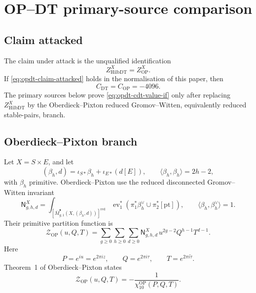 \section{OP--DT primary-source comparison}
\label{sec:op-dt-primary-source-comparison}

\subsection{Claim attacked}

The claim under attack is the unqualified identification
\begin{equation}
\label{eq:opdt-claim-attacked}
Z^{X}_{\mathrm{HilbDT}}=Z^{X}_{\mathrm{OP}}.
\end{equation}
If \eqref{eq:opdt-claim-attacked} holds in the normalisation of this
paper, then
\begin{equation}
\label{eq:opdt-cdt-value-if}
C_{\mathrm{DT}}=C_{\mathrm{OP}}=-4096.
\end{equation}
The primary sources below prove \eqref{eq:opdt-cdt-value-if} only after
replacing \(Z^{X}_{\mathrm{HilbDT}}\) by the Oberdieck--Pixton reduced
Gromov--Witten, equivalently reduced stable-pairs, branch.

\subsection{Oberdieck--Pixton branch}

Let \(X=S\times E\), and let
\begin{equation}
\label{eq:opdt-class}
(\beta_h,d)=\iota_{S*}\beta_h+\iota_{E*}(d[E]),
\qquad
\langle\beta_h,\beta_h\rangle=2h-2,
\end{equation}
with \(\beta_h\) primitive.  Oberdieck--Pixton use the reduced
disconnected Gromov--Witten invariant
\begin{equation}
\label{eq:opdt-op-invariant}
\mathsf N^X_{g,h,d}
=
\int_{[\overline M^{\bullet}_{g,1}(X,(\beta_h,d))]^{\mathrm{red}}}
\operatorname{ev}_1^*
\left(\pi_1^*\beta_h^\vee\cup\pi_2^*[\mathrm{pt}]\right),
\qquad
\langle\beta_h,\beta_h^\vee\rangle=1.
\end{equation}
Their primitive partition function is
\begin{equation}
\label{eq:opdt-op-series}
\mathcal Z_{\mathrm{OP}}(u,Q,T)
=
\sum_{g\geq0}\sum_{h\geq0}\sum_{d\geq0}
\mathsf N^X_{g,h,d}\,u^{2g-2}Q^{h-1}T^{d-1}.
\end{equation}
Here
\begin{equation}
\label{eq:opdt-op-variables}
P=e^{iu}=e^{2\pi iz},\qquad
Q=e^{2\pi i\tau},\qquad
T=e^{2\pi i\widetilde\tau}.
\end{equation}
Theorem~1 of Oberdieck--Pixton \cite{OB} states
\begin{equation}
\label{eq:opdt-op-theorem}
\mathcal Z_{\mathrm{OP}}(u,Q,T)
=
-\frac{1}{\chi_{10}^{\mathrm{OP}}(P,Q,T)}.
\end{equation}

